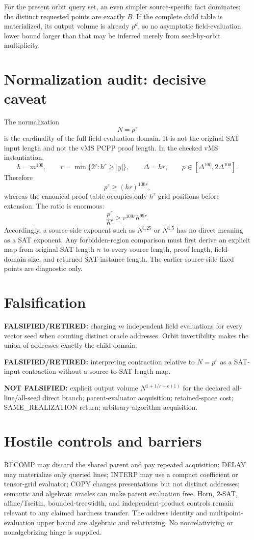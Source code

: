 \documentclass[11pt]{article}
\begin{document}
For the present orbit query set, an even simpler source-specific fact dominates: the distinct requested points are exactly \(B\). If the complete child table is materialized, its output volume is already \(p^d\), so no asymptotic field-evaluation lower bound larger than that may be inferred merely from seed-by-orbit multiplicity.

\section*{Normalization audit: decisive caveat}
The normalization
\[
N=p^r
\]
is the cardinality of the full field evaluation domain. It is not the original SAT input length and not the vMS PCPP proof length. In the checked vMS instantiation,
\[
h=m^{100},\qquad r=\min\{2^j:h^r\ge |y|\},\qquad
\Delta=hr,\qquad p\in[\Delta^{100},2\Delta^{100}].
\]
Therefore
\[
p^r\ge (hr)^{100r},
\]
whereas the canonical proof table occupies only \(h^r\) grid positions before extension. The ratio is enormous:
\[
\frac{p^r}{h^r}\ge r^{100r}h^{99r}.
\]
Accordingly, a source-side exponent such as \(N^{1.25}\) or \(N^{1.5}\) has no direct meaning as a SAT exponent. Any forbidden-region comparison must first derive an explicit map from original SAT length \(n\) to every source length, proof length, field-domain size, and returned SAT-instance length. The earlier source-side fixed points are diagnostic only.

\section*{Falsification}
\textbf{FALSIFIED/RETIRED:} charging \(m\) independent field evaluations for every vector seed when counting distinct oracle addresses. Orbit invertibility makes the union of addresses exactly the child domain.

\textbf{FALSIFIED/RETIRED:} interpreting contraction relative to \(N=p^r\) as a SAT-input contraction without a source-to-SAT length map.

\textbf{NOT FALSIFIED:} explicit output volume \(N^{1+1/r+o(1)}\) for the declared all-line/all-seed direct branch; parent-evaluator acquisition; retained-space cost; SAME\_REALIZATION return; arbitrary-algorithm acquisition.

\section*{Hostile controls and barriers}
RECOMP may discard the shared parent and pay repeated acquisition; DELAY may materialize only queried lines; INTERP may use a compact coefficient or tensor-grid evaluator; COPY changes presentations but not distinct addresses; semantic and algebraic oracles can make parent evaluation free. Horn, 2-SAT, affine/Tseitin, bounded-treewidth, and independent-product controls remain relevant to any claimed hardness transfer. The address identity and multipoint-evaluation upper bound are algebraic and relativizing. No nonrelativizing or nonalgebrizing hinge is supplied.
\end{document}
